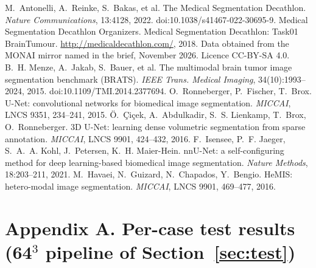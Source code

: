 \documentclass[10pt,a4paper]{article}
\newcommand{\mL}{\,mL}
\begin{document}
\begin{thebibliography}{9}\footnotesize
\setlength{\itemsep}{0pt}
 M.~Antonelli, A.~Reinke, S.~Bakas, et al. The Medical Segmentation Decathlon. \emph{Nature Communications}, 13:4128, 2022. doi:10.1038/s41467-022-30695-9.
 Medical Segmentation Decathlon Organizers. Medical Segmentation Decathlon: Task01 BrainTumour. \url{http://medicaldecathlon.com/}, 2018. Data obtained from the MONAI mirror named in the brief, November 2026. Licence CC-BY-SA 4.0.
 B.~H. Menze, A.~Jakab, S.~Bauer, et al. The multimodal brain tumor image segmentation benchmark (BRATS). \emph{IEEE Trans. Medical Imaging}, 34(10):1993--2024, 2015. doi:10.1109/TMI.2014.2377694.
 O.~Ronneberger, P.~Fischer, T.~Brox. U-Net: convolutional networks for biomedical image segmentation. \emph{MICCAI}, LNCS 9351, 234--241, 2015.
 \"O.~\c{C}i\c{c}ek, A.~Abdulkadir, S.~S. Lienkamp, T.~Brox, O.~Ronneberger. 3D U-Net: learning dense volumetric segmentation from sparse annotation. \emph{MICCAI}, LNCS 9901, 424--432, 2016.
 F.~Isensee, P.~F. Jaeger, S.~A.~A. Kohl, J.~Petersen, K.~H. Maier-Hein. nnU-Net: a self-configuring method for deep learning-based biomedical image segmentation. \emph{Nature Methods}, 18:203--211, 2021.
 M.~Havaei, N.~Guizard, N.~Chapados, Y.~Bengio. HeMIS: hetero-modal image segmentation. \emph{MICCAI}, LNCS 9901, 469--477, 2016.
\end{thebibliography}

\clearpage
\appendix
\section*{Appendix A. Per-case test results (64$^3$ pipeline of Section~\ref{sec:test})}
\begin{table}[H]
\centering
\caption{All 73 test cases, uniform model with the 0.5\mL{} component rule. $^\dagger$ = scan also present (as a twin) in train or validation. $\Delta V$ = signed volume error.}
\label{tab:cases}

\end{table}
\end{document}

